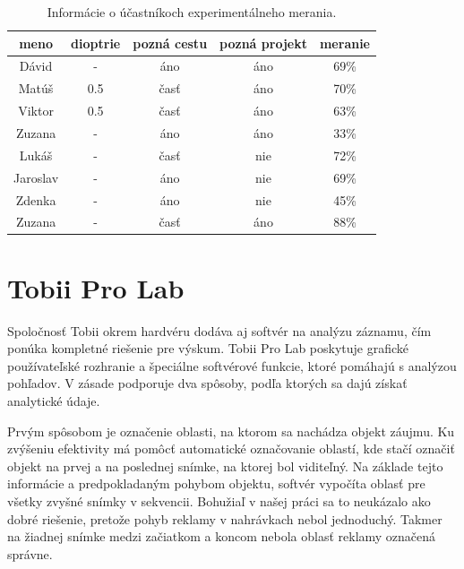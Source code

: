 \begin{table}[ht]
\centering
\begin{tabular}{ |c c c c c|  }
\hline
meno & dioptrie & pozná cestu & pozná projekt & meranie \\
\hline
Dávid & - & áno & áno & 69\% \\
Matúš & 0.5 & časť & áno & 70\% \\
Viktor & 0.5 & časť & áno & 63\% \\
Zuzana & - & áno & áno & 33\% \\
Lukáš & - & časť & nie & 72\% \\
Jaroslav & - & áno & nie & 69\% \\
Zdenka & - & áno & nie & 45\% \\
Zuzana & - & časť & áno & 88\% \\
\hline
\end{tabular}
\caption{Informácie o účastníkoch experimentálneho merania.}
\label{table:1}
\end{table}

\section{Tobii Pro Lab}

Spoločnosť Tobii okrem hardvéru dodáva aj softvér na analýzu záznamu, čím ponúka kompletné riešenie pre výskum. Tobii Pro Lab poskytuje grafické používateľské rozhranie a špeciálne softvérové funkcie, ktoré pomáhajú s analýzou pohľadov. V zásade podporuje dva spôsoby, podľa ktorých sa dajú získať analytické údaje. 

Prvým spôsobom je označenie oblasti, na ktorom sa nachádza objekt záujmu. Ku zvýšeniu efektivity má pomôcť automatické označovanie oblastí, kde stačí označiť objekt na prvej a na poslednej snímke, na ktorej bol viditeľný. Na základe tejto informácie a predpokladaným pohybom objektu, softvér vypočíta oblasť pre všetky zvyšné snímky v sekvencii. Bohužiaľ v našej práci sa to neukázalo ako dobré riešenie, pretože pohyb reklamy v nahrávkach nebol jednoduchý. Takmer na žiadnej snímke medzi začiatkom a koncom nebola oblasť reklamy označená správne. 

